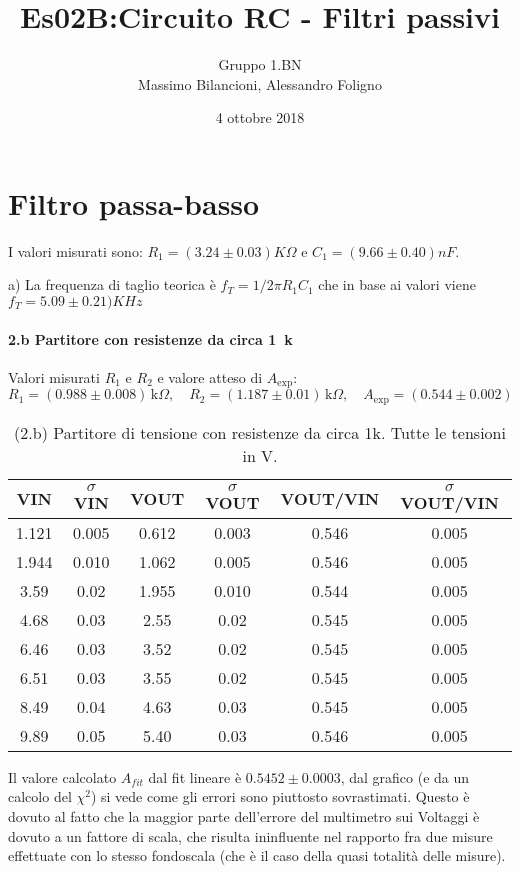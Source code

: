 \documentclass[10pt,a4paper]{article}
\author{Gruppo 1.BN \\ Massimo Bilancioni, Alessandro Foligno }
\title{Es02B:Circuito RC - Filtri passivi}
\begin{document}
\date{4 ottobre 2018}
\maketitle

\setcounter{section}{1}
\section{Filtro passa-basso}
I valori misurati sono: $R_1  = (3.24\pm 0.03 )K\Omega$ e  $C_1  = (9.66\pm 0.40 )nF$.

a) La frequenza di taglio teorica è  $f_T = 1/2\pi R_1 C_1$ che in base ai valori viene $f_T = 5.09\pm 0.21)KHz$


\paragraph{2.b Partitore con resistenze da circa 1~k}
Valori misurati $R_1$ e $R_2$ e valore atteso di $A_\mathrm{exp}$:
\[
R_1 = (0.988  \pm0.008  ) \,\mathrm{k}\Omega, \quad
R_2 = (1.187 \pm 0.01 ) \,\mathrm{k}\Omega, \quad
A_\mathrm{exp} = ( 0.544 \pm 0.002 ) 
\]


\begin{table}[h]
\centering
\begin{tabular}{|c|c|c|c|c|c|}
\hline 
VIN& $\sigma$ VIN  &VOUT	 & $\sigma$ VOUT& VOUT/VIN & $\sigma$ VOUT/VIN \\
\hline 
1.121 & 0.005 & 0.612 & 0.003 & 0.546 & 0.005\\
1.944& 0.010 & 1.062& 0.005 & 0.546 & 0.005\\

3.59& 0.02 & 1.955 & 0.010 & 0.544 & 0.005\\

4.68 & 0.03 & 2.55 & 0.02 & 0.545 & 0.005\\
6.46 & 0.03 & 3.52 & 0.02 & 0.545& 0.005\\
6.51 & 0.03& 3.55 & 0.02& 0.545 & 0.005 \\
8.49 & 0.04 & 4.63& 0.03 & 0.545& 0.005\\
9.89 & 0.05 & 5.40 & 0.03 & 0.546 & 0.005\\


\hline 
\end{tabular} 
\caption{(2.b) Partitore di tensione con resistenze da circa 1k. Tutte le tensioni in V.\label{t:par1}}
\end{table}



Il valore calcolato $A_{fit}$ dal fit lineare è $ 0.5452\pm0.0003$, dal grafico (e da un  calcolo del $\chi^2$) si vede come gli errori sono piuttosto sovrastimati. Questo  è dovuto al fatto che la maggior parte dell'errore del multimetro sui Voltaggi è dovuto a un fattore di scala, che risulta ininfluente nel rapporto fra due misure effettuate con lo stesso fondoscala  (che è il caso della quasi totalità delle misure).
\end{document}
